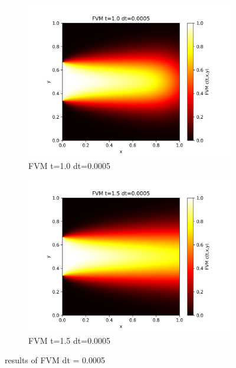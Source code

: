 \documentclass[11pt,a4 paper,one side]{article}
\begin{document}
\begin{figure}[htbp]
    \vspace{0.5cm}  %
    
    \begin{subfigure}{0.45\textwidth}
        \includegraphics[width=\textwidth]{FVM t=1.0 dt=0.0005.png}
        \caption{FVM t=1.0 dt=0.0005}
        \label{FVM t=1.0 dt=0.0005}
    \end{subfigure}
    \hfill
    \begin{subfigure}{0.45\textwidth}
        \includegraphics[width=\textwidth]{FVM t=1.5 dt=0.0005.png}
        \caption{FVM t=1.5 dt=0.0005}
        \label{FVM t=1.5 dt=0.0005}
    \end{subfigure}
    
    \caption{results of FVM dt = 0.0005}
    \label{results of FVM dt = 0.0005}
\end{figure}
\end{document}
